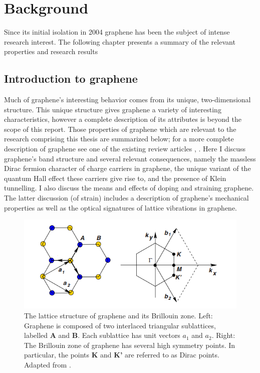 \documentclass[edeposit,fullpage,draftthesis]{uiucthesis2009}
\begin{document}
\chapter{Background}

    Since its initial isolation in 2004 graphene has been the subject of intense research interest. 
    The following chapter presents a summary of the relevant properties and research results 

    \section{Introduction to graphene}

    Much of graphene's interesting behavior comes from its unique, two-dimensional structure. 
    This unique structure gives graphene a variety of interesting characteristics, however a complete 
    description of its attributes is beyond the scope of this report. Those properties of graphene 
    which are relevant to the research comprising this thesis are summarized below; for a more complete description 
    of graphene see one of the existing review articles \cite{geim2007rise}, \cite{CastroNeto2009}. 
    Here I discuss graphene's band structure and several relevant consequences, namely 
    the massless Dirac fermion character of charge carriers in graphene, 
    the unique variant of the quantum Hall effect these carriers give rise to, 
    and the presence of Klein tunnelling.
    I also discuss the means and effects of doping and straining graphene. The latter discussion (of strain)
    includes a description of graphene's mechanical properties as well as the optical signatures of 
    lattice vibrations in graphene.
    
    \begin{figure}
    \centering
    \includegraphics{images/background/ElecPropertiesFig2.png}
    \caption[The lattice structure of graphene and its Brillouin zone]{The lattice structure of graphene and its Brillouin zone. Left: Graphene is composed of two interlaced triangular sublattices, labelled \textbf{A} and \textbf{B}. Each sublattice has unit vectors $a_1$ and $a_2$. Right: The Brillouin zone of graphene has several high symmetry points. In particular, the points \textbf{K} and \textbf{K'} are referred to as Dirac points. Adapted from \cite{CastroNeto2009}.}
    \label{fig:lattice}
    \end{figure}
		
\end{document}
